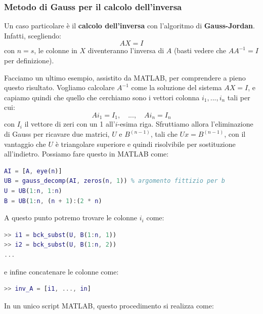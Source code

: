 \documentclass[a4paper,11pt]{article}
\begin{document}
\subsubsection{Metodo di Gauss per il calcolo dell'inversa}
Un caso particolare è il \textbf{calcolo dell'inversa} con l'algoritmo di \textbf{Gauss-Jordan}.
Infatti, scegliendo:
$$
AX = I
$$
con $n = s$, le colonne in $X$ diventeranno l'inversa di $A$ (basti vedere che $A A^{-1} = I$ per definizione).

Facciamo un ultimo esempio, assistito da MATLAB, per comprendere a pieno questo risultato.
Vogliamo calcolare $A^{-1}$ come la soluzione del sistema $AX = I$, e capiamo quindi che quello che cerchiamo sono i vettori colonna $i_1, ..., i_n$ tali per cui:
$$
A i_1 = I_1, \quad ..., \quad A i_n = I_n
$$
con $I_i$ il vettore di zeri con un 1 all'$i$-esima riga.
Sfruttiamo allora l'eliminazione di Gauss per ricavare due matrici, $U$ e $B^{(n - 1)}$, tali che $Ux = B^{(n - 1)}$, con il vantaggio che $U$ è triangolare superiore e quindi risolvibile per sostituzione all'indietro.
Possiamo fare questo in MATLAB come:
\begin{lstlisting}[language=matlab, style=codestyle]	
AI = [A, eye(n)]
UB = gauss_decomp(AI, zeros(n, 1)) % argomento fittizio per b
U = UB(1:n, 1:n)
B = UB(1:n, (n + 1):(2 * n)
\end{lstlisting}

A questo punto potremo trovare le colonne $i_i$ come:
\begin{lstlisting}[language=matlab, style=codestyle]	
>> i1 = bck_subst(U, B(1:n, 1))
>> i2 = bck_subst(U, B(1:n, 2))
...
\end{lstlisting}
e infine concatenare le colonne come:
\begin{lstlisting}[language=matlab, style=codestyle]	
>> inv_A = [i1, ..., in]
\end{lstlisting}

In un unico script MATLAB, questo procedimento si realizza come:

\end{document}
